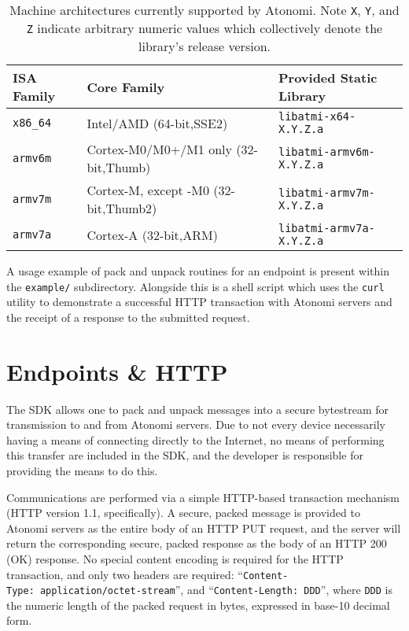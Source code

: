\begin{table}[h]
\centering
\begin{tabular}{l l l}
	\textbf{ISA Family} & \textbf{Core Family} & \textbf{Provided Static Library} \\
	\hline
	\texttt{x86_64} & Intel/AMD (64-bit,SSE2)              & \texttt{libatmi-x64-X.Y.Z.a}    \\
	\texttt{armv6m} & Cortex-M0/M0+/M1 only (32-bit,Thumb) & \texttt{libatmi-armv6m-X.Y.Z.a} \\
	\texttt{armv7m} & Cortex-M, except -M0 (32-bit,Thumb2) & \texttt{libatmi-armv7m-X.Y.Z.a} \\
	\texttt{armv7a} & Cortex-A (32-bit,ARM)                & \texttt{libatmi-armv7a-X.Y.Z.a} \\
\end{tabular}
\caption{Machine architectures currently supported by Atonomi. Note \texttt{X},
	\texttt{Y}, and \texttt{Z} indicate arbitrary numeric values which
	collectively denote the library's release version.}
\label{t:libatmi_arches}
\end{table}

A usage example of pack and unpack routines for an endpoint is present within
the \texttt{example/} subdirectory. Alongside this is a shell script which
uses the \texttt{curl} utility to demonstrate a successful HTTP transaction
with Atonomi servers and the receipt of a response to the submitted request.


\section{Endpoints \&{} HTTP}
The SDK allows one to pack and unpack messages into a secure bytestream
for transmission to and from Atonomi servers. Due to not every device
necessarily having a means of connecting directly to the Internet, no
means of performing this transfer are included in the SDK, and the developer
is responsible for providing the means to do this.

Communications are performed via a simple HTTP-based transaction mechanism
(HTTP version 1.1, specifically). A secure, packed message is provided to
Atonomi servers as the entire body of an HTTP PUT request, and the server
will return the corresponding secure, packed response as the body of an
HTTP 200 (OK) response. No special content encoding is required for the
HTTP transaction, and only two headers are required:
``\texttt{Content-Type:~application/octet-stream}'', and
``\texttt{Content-Length:~DDD}'', where \texttt{DDD} is the numeric length
of the packed request in bytes, expressed in base-10 decimal form.

